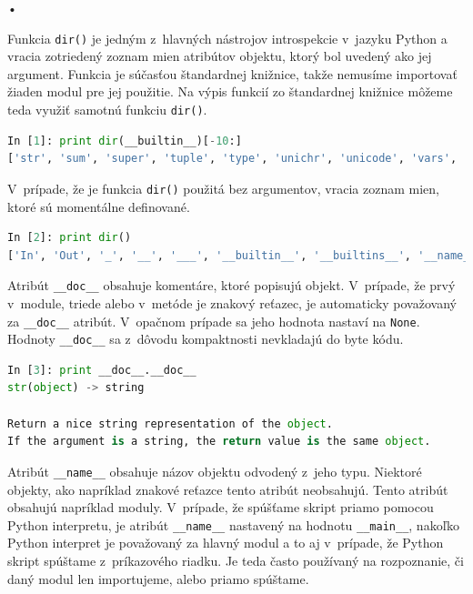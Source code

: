 \documentclass[11pt,oneside,final]{fithesis2}
\begin{document}
\begin{list}{•}{}
		\item 
			Funkcia \texttt{dir()} je jedným z~hlavných nástrojov introspekcie v~jazyku Python a vracia zotriedený zoznam mien atribútov objektu, ktorý bol uvedený ako jej argument. Funkcia je súčasťou štandardnej knižnice, takže nemusíme importovať žiaden modul pre jej použitie. Na výpis funkcií zo štandardnej knižnice môžeme teda využiť samotnú funkciu \texttt{dir()}.
			

\begin{lstlisting}[language=python]
In [1]: print dir(__builtin__)[-10:]
['str', 'sum', 'super', 'tuple', 'type', 'unichr', 'unicode', 'vars', 'xrange', 'zip']
\end{lstlisting}

			 V~prípade, že je funkcia \texttt{dir()} použitá bez argumentov, vracia zoznam mien, ktoré sú momentálne definované.

\begin{lstlisting}[language=python]
In [2]: print dir()
['In', 'Out', '_', '__', '___', '__builtin__', '__builtins__', '__name__', '_dh', '_i', '_i1', '_i2', '_ih', '_ii', '_iii', '_oh', '_sh', 'exit', 'get_ipython', 'help', 'quit']

\end{lstlisting}
	

		\item 
			Atribút \texttt{\_\_doc\_\_} obsahuje komentáre, ktoré popisujú objekt. V~prípade, že prvý v~module, triede alebo v~metóde je znakový reťazec, je automaticky považovaný za \texttt{\_\_doc\_\_} atribút. V~opačnom prípade sa jeho hodnota nastaví na \texttt{None}. Hodnoty \texttt{\_\_doc\_\_} sa z~dôvodu kompaktnosti nevkladajú do byte kódu.
			
\begin{lstlisting}[language=python]
In [3]: print __doc__.__doc__
str(object) -> string

Return a nice string representation of the object.
If the argument is a string, the return value is the same object.
\end{lstlisting}

		\item 
			Atribút \texttt{\_\_name\_\_} obsahuje názov objektu odvodený z~jeho typu. Niektoré objekty, ako napríklad znakové reťazce tento atribút neobsahujú. Tento atribút obsahujú napríklad moduly. V~prípade, že spúšťame skript priamo pomocou Python interpretu, je atribút \texttt{\_\_name\_\_} nastavený na hodnotu \texttt{\_\_main\_\_}, nakoľko Python interpret je považovaný za hlavný modul a to aj v~prípade, že Python skript spúštame z~príkazového riadku. Je teda často používaný na rozpoznanie, či daný modul len importujeme, alebo priamo spúštame.
	

\end{list}
\end{document}

